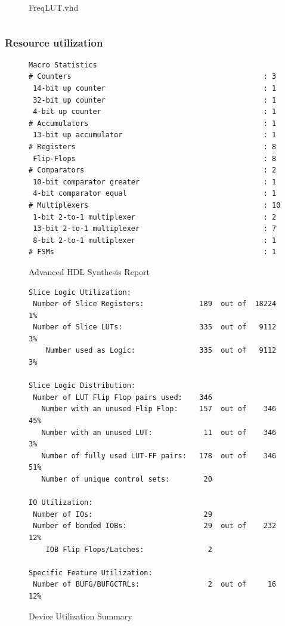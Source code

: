 \documentclass{article}
\begin{document}
        \newpage
	      \begin{figure}[H]
	        \caption{FreqLUT.vhd}
	      \end{figure}
        \begin{mdframed}[linecolor=black, topline=true, bottomline=true, leftline=false, rightline=false]
            \inputminted[linenos=true]{vhdl}{../OctaveKeyboard/FreqLUT.vhd}
        \end{mdframed}

      \newpage
	    \subsubsection{Resource utilization}
			\begin{figure}[H]  
				\caption{Advanced HDL Synthesis Report}
	   			\begin{lstlisting}
Macro Statistics
# Counters                                             : 3
 14-bit up counter                                     : 1
 32-bit up counter                                     : 1
 4-bit up counter                                      : 1
# Accumulators                                         : 1
 13-bit up accumulator                                 : 1
# Registers                                            : 8
 Flip-Flops                                            : 8
# Comparators                                          : 2
 10-bit comparator greater                             : 1
 4-bit comparator equal                                : 1
# Multiplexers                                         : 10
 1-bit 2-to-1 multiplexer                              : 2
 13-bit 2-to-1 multiplexer                             : 7
 8-bit 2-to-1 multiplexer                              : 1
# FSMs                                                 : 1
	   			\end{lstlisting}
	   		\end{figure}

	   		\begin{figure}[H]  
	   			\caption{Device Utilization Summary}
	   			\begin{lstlisting}
Slice Logic Utilization: 
 Number of Slice Registers:             189  out of  18224     1%  
 Number of Slice LUTs:                  335  out of   9112     3%  
    Number used as Logic:               335  out of   9112     3%  

Slice Logic Distribution: 
 Number of LUT Flip Flop pairs used:    346
   Number with an unused Flip Flop:     157  out of    346    45%  
   Number with an unused LUT:            11  out of    346     3%  
   Number of fully used LUT-FF pairs:   178  out of    346    51%  
   Number of unique control sets:        20

IO Utilization: 
 Number of IOs:                          29
 Number of bonded IOBs:                  29  out of    232    12%  
    IOB Flip Flops/Latches:               2

Specific Feature Utilization:
 Number of BUFG/BUFGCTRLs:                2  out of     16    12%  
	   			\end{lstlisting}
	   		\end{figure}
\end{document}
